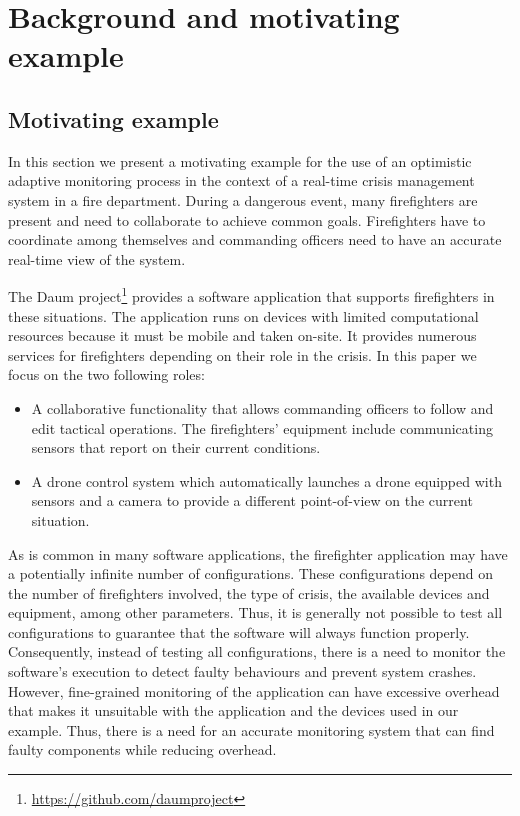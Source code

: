 \section{Background and motivating example}\label{sec:background}

\subsection{Motivating example\label{sec:motivatingexample}}

In this section we present a motivating example for the use of an optimistic adaptive monitoring process in the context of a real-time crisis management system in a fire department. 
During a dangerous event, many firefighters are present and need to collaborate to achieve common goals.
Firefighters have to coordinate among themselves and commanding officers need to have an accurate real-time view of the system.

The Daum project\footnote{\url{https://github.com/daumproject}} provides a software application that supports firefighters in these situations.
The application runs on devices with limited computational resources because it must be mobile and taken on-site.
It provides numerous services for firefighters depending on their role in the crisis. In this paper we focus on the two following roles:
\begin{itemize}
\leftskip -.2in
 \item A collaborative functionality that allows commanding officers to follow and edit tactical operations. The firefighters' equipment include communicating sensors that report on their current conditions.
 \item A drone control system which automatically launches a drone equipped with sensors and a camera to provide a different point-of-view on the current situation.
\end{itemize}

As is common in many software applications, the firefighter application may have a potentially infinite number of configurations. These configurations depend on the number of firefighters involved, the type of crisis, the available devices and equipment, among other parameters. 
Thus, it is generally not possible to test all configurations to guarantee that the software will always function properly. 
Consequently, instead of testing all configurations, there is a need to monitor the software's execution to detect faulty behaviours and prevent system crashes. 
However, fine-grained monitoring of the application can have excessive overhead that makes it unsuitable with the application and the devices used in our example.
Thus, there is a need for an accurate monitoring system that can find faulty components while reducing overhead.

